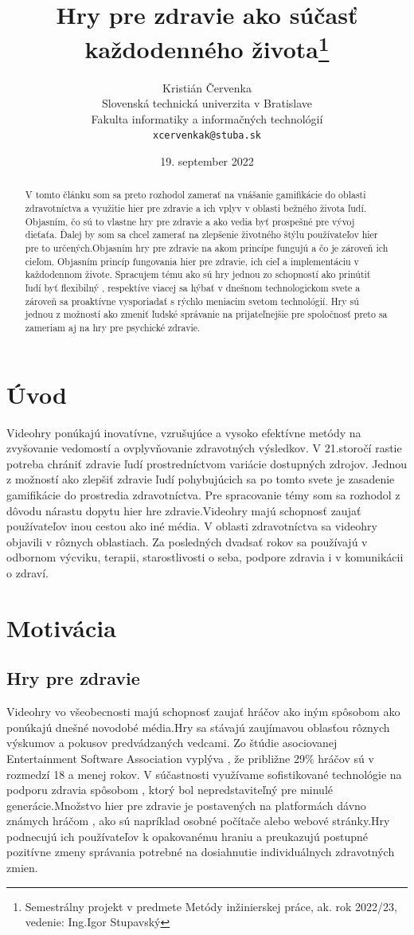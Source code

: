 \documentclass[10pt,twoside,slovak,a4paper]{coursepaper}
\title{Hry pre zdravie ako súčasť každodenného života\thanks{Semestrálny projekt v predmete Metódy inžinierskej práce, ak. rok 2022/23, vedenie: Ing.Igor Stupavský}} %
\author{Kristián Červenka\\[2pt]
	{\small Slovenská technická univerzita v Bratislave}\\
	{\small Fakulta informatiky a informačných technológií}\\
	{\small \texttt{xcervenkak@stuba.sk}}
	}
\date{\small 19. september 2022} %
\begin{document}
\maketitle

\begin{abstract}
V tomto článku som sa preto rozhodol zamerať na vnášanie gamifikácie do oblasti zdravotníctva a využitie hier pre zdravie a ich vplyv v oblasti bežného života ľudí.
Objasním, čo sú to vlastne hry pre zdravie a ako vedia byť prospešné pre vývoj dieťaťa.
Ďalej by som sa chcel zamerať na zlepšenie životného štýlu používateľov hier pre to určených.Objasním hry pre zdravie na akom princípe fungujú a čo je zároveň ich cieľom.
Objasním princíp fungovania hier pre zdravie, ich cieľ a implementáciu v každodennom živote.
Spracujem tému ako sú hry jednou zo schopností ako prinútiť ľudí byť flexibilný , respektíve viacej sa hýbať v dnešnom technologickom svete a zároveň sa proaktívne vysporiadať s rýchlo meniacim svetom technológií. 
Hry sú jednou z možností ako zmeniť ľudské správanie na prijateľnejšie pre spoločnosť preto sa zameriam aj na hry pre psychické zdravie.
\end{abstract}



\section{Úvod}
Videohry ponúkajú inovatívne, vzrušujúce a vysoko efektívne metódy na zvyšovanie vedomostí a ovplyvňovanie zdravotných výsledkov. 
V 21.storočí rastie potreba chrániť zdravie ľudí prostredníctvom variácie dostupných zdrojov.
Jednou z možností ako zlepšiť zdravie ľudí pohybujúcich sa po tomto svete je zasadenie gamifikácie do prostredia zdravotníctva. 
Pre spracovanie témy som sa rozhodol z dôvodu nárastu dopytu hier hre zdravie.Videohry majú schopnosť zaujať používateľov inou cestou ako iné média.
V oblasti zdravotníctva sa videohry objavili v rôznych oblastiach. 
Za posledných dvadsať rokov sa používajú v odbornom výcviku, terapii, starostlivosti o seba, podpore zdravia i v komunikácii o zdraví.


\section{Motivácia} 
\subsection{Hry pre zdravie}
Videohry vo všeobecnosti majú schopnosť zaujať hráčov ako iným spôsobom ako ponúkajú dnešné novodobé média.Hry sa stávajú zaujímavou oblasťou rôznych výskumov a pokusov predvádzaných vedcami. Zo štúdie asociovanej Entertainment Software Association \cite{PLP-Framework} vyplýva , že približne 29\% hráčov sú v rozmedzí 18 a menej rokov. 
V súčastnosti využívame sofistikované technológie na podporu zdravia spôsobom , ktorý bol nepredstaviteľný pre minulé generácie.Množstvo hier pre zdravie je postavených na platformách dávno známych hráčom , ako sú napríklad osobné počítače alebo webové stránky.Hry podnecujú ich používateľov k opakovanému hraniu a preukazujú postupné  pozitívne zmeny správania potrebné na dosiahnutie individuálnych zdravotných zmien.
\end{document}
